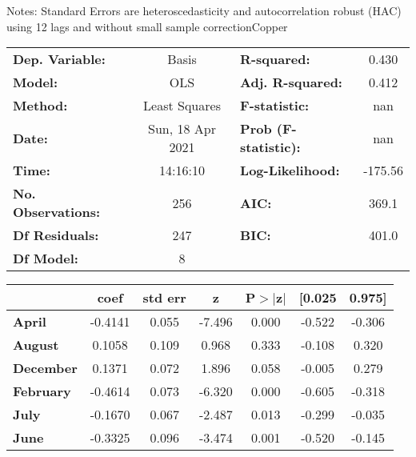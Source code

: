 Notes: \newline
 [1] Standard Errors are heteroscedasticity and autocorrelation robust (HAC) using 12 lags and without small sample correctionCopper\begin{center}
\begin{tabular}{lclc}
\toprule
\textbf{Dep. Variable:}    &      Basis       & \textbf{  R-squared:         } &     0.430   \\
\textbf{Model:}            &       OLS        & \textbf{  Adj. R-squared:    } &     0.412   \\
\textbf{Method:}           &  Least Squares   & \textbf{  F-statistic:       } &       nan   \\
\textbf{Date:}             & Sun, 18 Apr 2021 & \textbf{  Prob (F-statistic):} &      nan    \\
\textbf{Time:}             &     14:16:10     & \textbf{  Log-Likelihood:    } &   -175.56   \\
\textbf{No. Observations:} &         256      & \textbf{  AIC:               } &     369.1   \\
\textbf{Df Residuals:}     &         247      & \textbf{  BIC:               } &     401.0   \\
\textbf{Df Model:}         &           8      & \textbf{                     } &             \\
\bottomrule
\end{tabular}
\begin{tabular}{lcccccc}
                  & \textbf{coef} & \textbf{std err} & \textbf{z} & \textbf{P$> |$z$|$} & \textbf{[0.025} & \textbf{0.975]}  \\
\midrule
\textbf{April}    &      -0.4141  &        0.055     &    -7.496  &         0.000        &       -0.522    &       -0.306     \\
\textbf{August}   &       0.1058  &        0.109     &     0.968  &         0.333        &       -0.108    &        0.320     \\
\textbf{December} &       0.1371  &        0.072     &     1.896  &         0.058        &       -0.005    &        0.279     \\
\textbf{February} &      -0.4614  &        0.073     &    -6.320  &         0.000        &       -0.605    &       -0.318     \\
\textbf{July}     &      -0.1670  &        0.067     &    -2.487  &         0.013        &       -0.299    &       -0.035     \\
\textbf{June}     &      -0.3325  &        0.096     &    -3.474  &         0.001        &       -0.520    &       -0.145     \\

\end{tabular}
\end{center}
